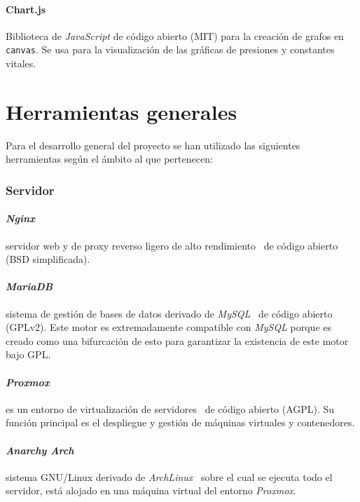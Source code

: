 \paragraph{Chart.js}Biblioteca de \textit{JavaScript} de código abierto (MIT) para la creación de grafos en \texttt{canvas}. Se usa para la visualización de las gráficas de presiones y constantes vitales.

\section{Herramientas generales}

Para el desarrollo general del proyecto se han utilizado las siguientes herramientas según el ámbito al que pertenecen:

\subsubsection{Servidor}
\paragraph{\textit{Nginx}}servidor web y de proxy reverso ligero de alto rendimiento~\cite{wiki:nginx} de código abierto (BSD simplificada).
\paragraph{\textit{MariaDB}}sistema de gestión de bases de datos derivado de \textit{MySQL}~\cite{wiki:mariadb} de código abierto (GPLv2). Este motor es extremadamente compatible con \textit{MySQL} porque es creado como una bifurcación de esto para garantizar la existencia de este motor bajo GPL.
\paragraph{\textit{Proxmox}}es un entorno de virtualización de servidores~\cite{wiki:proxmox} de código abierto (AGPL). Su función principal es el despliegue y gestión de máquinas virtuales y contenedores.
\paragraph{\textit{Anarchy Arch}}sistema GNU/Linux derivado de \textit{ArchLinux}~\cite{wiki:arch} sobre el cual se ejecuta todo el servidor, está alojado en una máquina virtual del entorno \textit{Proxmox}.

